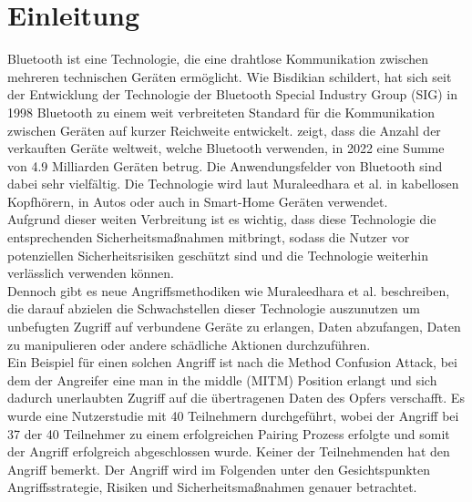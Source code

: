 \documentclass[
    a4paper,
    pagesize,
    pdftex,
    12pt,
]{scrartcl}
\begin{document}

    \newpage


    \thispagestyle{empty}
    \tableofcontents
    \newpage


    \section{Einleitung}
    Bluetooth ist eine Technologie, die eine drahtlose Kommunikation zwischen mehreren technischen Geräten ermöglicht. Wie Bisdikian \cite{history_of_bluetooth} schildert, hat sich seit der Entwicklung der Technologie der Bluetooth Special Industry Group (SIG) in 1998 Bluetooth zu einem weit verbreiteten Standard für die Kommunikation zwischen Geräten auf kurzer Reichweite entwickelt.
    \cite{bluetooth_device_shipments} zeigt, dass die Anzahl der verkauften Geräte weltweit, welche Bluetooth verwenden, in 2022 eine Summe von 4.9 Milliarden Geräten betrug.
    Die Anwendungsfelder von Bluetooth sind dabei sehr vielfältig. Die Technologie wird laut Muraleedhara et al. \cite{bluetooth_newest_security_risks} in kabellosen Kopfhörern, in Autos oder auch in Smart-Home Geräten verwendet. \\
    Aufgrund dieser weiten Verbreitung ist es wichtig, dass diese Technologie die entsprechenden Sicherheitsmaßnahmen mitbringt, sodass die Nutzer vor potenziellen Sicherheitsrisiken geschützt sind und die Technologie weiterhin verlässlich verwenden können. \\
    Dennoch gibt es neue Angriffsmethodiken wie Muraleedhara et al. \cite{bluetooth_newest_security_risks} beschreiben, die darauf abzielen die Schwachstellen dieser Technologie auszunutzen um unbefugten Zugriff auf verbundene Geräte zu erlangen, Daten abzufangen, Daten zu manipulieren oder andere schädliche Aktionen durchzuführen. \\
    Ein Beispiel für einen solchen Angriff ist nach \cite{method_confusion_attack} die Method Confusion Attack, bei dem der Angreifer eine man in the middle (MITM) Position erlangt und sich dadurch unerlaubten Zugriff auf die übertragenen Daten des Opfers verschafft. Es wurde eine Nutzerstudie mit 40 Teilnehmern durchgeführt, wobei der Angriff bei 37 der 40 Teilnehmer zu einem erfolgreichen Pairing Prozess erfolgte und somit der Angriff erfolgreich abgeschlossen wurde. Keiner der Teilnehmenden hat den Angriff bemerkt.
    Der Angriff wird im Folgenden unter den Gesichtspunkten Angriffsstrategie, Risiken und Sicherheitsmaßnahmen genauer betrachtet.
\end{document}
